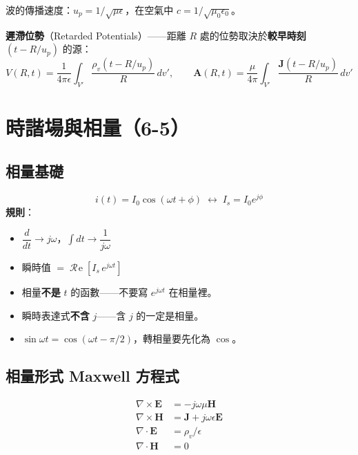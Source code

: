 \documentclass[12pt,a4paper]{article}
\newcommand{\vE}{\mathbf{E}}
\newcommand{\vH}{\mathbf{H}}
\newcommand{\vJ}{\mathbf{J}}
\newcommand{\vA}{\mathbf{A}}
\newcommand{\Rea}{\operatorname{\mathcal{R}\!e}}
\begin{document}
波的傳播速度：$u_p = 1/\sqrt{\mu\epsilon}$，在空氣中 $c = 1/\sqrt{\mu_0\epsilon_0}$。

\textbf{遲滯位勢}（Retarded Potentials）——距離 $R$ 處的位勢取決於\textbf{較早時刻} $(t-R/u_p)$ 的源：
\[
V(R,t) = \frac{1}{4\pi\epsilon}\int_{V'}\frac{\rho_v(t-R/u_p)}{R}\,dv', \qquad
\vA(R,t) = \frac{\mu}{4\pi}\int_{V'}\frac{\vJ(t-R/u_p)}{R}\,dv'
\]

\section{時諧場與相量（6-5）}

\subsection{相量基礎}

\begin{keybox}
\[
i(t) = I_0\cos(\omega t+\phi) \;\longleftrightarrow\; I_s = I_0 e^{j\phi}
\]
\textbf{規則}：
\begin{itemize}[nosep]
  \item $\dfrac{d}{dt} \to j\omega$，$\displaystyle\int dt \to \dfrac{1}{j\omega}$
  \item 瞬時值 $= \Rea[I_s\,e^{j\omega t}]$
\end{itemize}
\end{keybox}

\begin{warnbox}[常見錯誤]
\begin{itemize}[nosep]
  \item 相量\textbf{不是} $t$ 的函數——不要寫 $e^{j\omega t}$ 在相量裡。
  \item 瞬時表達式\textbf{不含} $j$——含 $j$ 的一定是相量。
  \item $\sin\omega t = \cos(\omega t - \pi/2)$，轉相量要先化為 $\cos$。
\end{itemize}
\end{warnbox}

\subsection{相量形式 Maxwell 方程式}

\begin{keybox}
\[
\begin{aligned}
\nabla\times\vE &= -j\omega\mu\vH \\
\nabla\times\vH &= \vJ + j\omega\epsilon\vE \\
\nabla\cdot\vE &= \rho_v/\epsilon \\
\nabla\cdot\vH &= 0
\end{aligned}
\]
\end{keybox}
\end{document}
